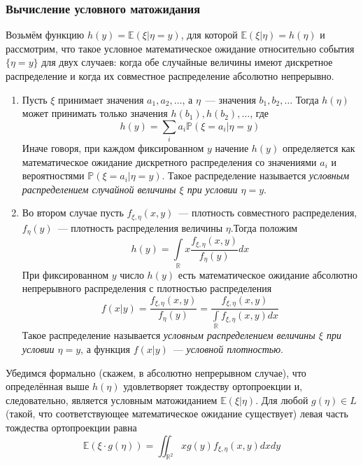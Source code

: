 \documentclass[oneside,final,14pt]{extreport}
\theoremstyle{plain}
\theoremstyle{definition}
\theoremstyle{named}
\begin{document}
\subsubsection{Вычисление условного матожидания}
Возьмём функцию $h(y)=\mathbb{E}(\xi | \eta=y)$, для которой $\mathbb{E}(\xi | \eta)=h(\eta)$ и рассмотрим, что такое условное математическое ожидание относительно события $\{\eta=y\}$ для двух случаев: когда обе случайные величины имеют дискретное распределение и когда их совместное распределение абсолютно непрерывно.
\begin{enumerate}
    \item Пусть $\xi$ принимает значения $a_{1}, a_{2}, \ldots$, а $\eta$~--- значения $b_{1}, b_{2}, \ldots$ Тогда $h(\eta)$ может принимать только значения $h\left(b_{1}\right), h\left(b_{2}\right), \ldots$, где
    \begin{equation*}
        h(y)=\sum\limits_{i} a_{i} \mathbb{P}\left(\xi=a_{i} | \eta=y\right)
    \end{equation*}
    Иначе говоря, при каждом фиксированном $y$ начение $h(y)$ определяется как математическое ожидание дискретного распределения со значениями $a_{i}$ и вероятностями $\mathbb{P}\left(\xi=a_{i} | \eta=y\right)$. Такое распределение называется {\it условным распределением случайной величины $\xi$ при условии $\eta = y$}.
    
    \item Во втором случае пусть $f_{\xi, \eta}(x, y)$~--- плотность совместного распределения, $f_{\eta}(y)$~--- плотность распределения величины $\eta$.Тогда положим
    \begin{equation*}
        h(y)=\int\limits_{\mathbb{R}} x \frac{f_{\xi, \eta}(x, y)}{f_{\eta}(y)} d x
    \end{equation*}
    При фиксированном $y$ число $h(y)$ есть математическое ожидание абсолютно непрерывного распределения с плотностью распределения
    \begin{equation*}
        f(x | y)=\frac{f_{\xi, \eta}(x, y)}{f_{\eta}(y)}=\frac{f_{\xi, \eta}(x, y)}{\int\limits_{\mathbb{R}} f_{\xi, \eta}(x, y) d x}
    \end{equation*}
    Такое распределение называется {\it условным распределением величины $\xi$ при условии $\eta = y$}, а функция $f(x | y)$~--- {\it условной плотностью}.
\end{enumerate}

    Убедимся формально (скажем, в абсолютно непрерывном случае), что определённая выше $h(\eta)$ удовлетворяет тождеству ортопроекции и, следовательно, является условным матожиданием $\mathbb{E}(\xi | \eta)$. Для любой $g(\eta) \in L$ (такой, что соответствующее математическое ожидание существует) левая часть тождества ортопроекции равна
    \begin{equation*}
        \mathbb{E}(\xi \cdot g(\eta))=\iint_{\mathbb{R}^{2}} x g(y) f_{\xi, \eta}(x, y) d x d y
    \end{equation*}
    
\end{document}
